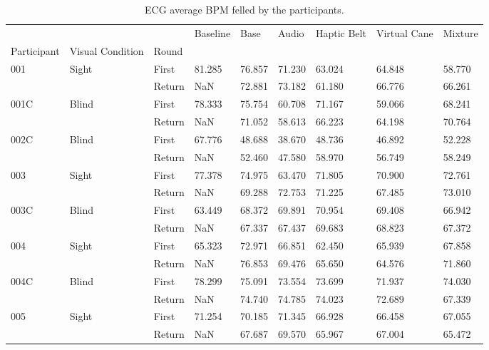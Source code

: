 
\begin{table}[!htb]
\centering
\caption{ECG average BPM felled by the participants.}
\label{tab:ecg_bpm_table}
\begin{tabular}{lllllllll}
\toprule
    &       &        &  Baseline &   Base &  Audio &  Haptic Belt &  Virtual Cane &  Mixture \\
Participant & Visual Condition & Round &           &        &        &              &               &          \\
\midrule
001 & Sight & First &    81.285 & 76.857 & 71.230 &       63.024 &        64.848 &   58.770 \\
    &       & Return &       NaN & 72.881 & 73.182 &       61.180 &        66.776 &   66.261 \\
001C & Blind & First &    78.333 & 75.754 & 60.708 &       71.167 &        59.066 &   68.241 \\
    &       & Return &       NaN & 71.052 & 58.613 &       66.223 &        64.198 &   70.764 \\
002C & Blind & First &    67.776 & 48.688 & 38.670 &       48.736 &        46.892 &   52.228 \\
    &       & Return &       NaN & 52.460 & 47.580 &       58.970 &        56.749 &   58.249 \\
003 & Sight & First &    77.378 & 74.975 & 63.470 &       71.805 &        70.900 &   72.761 \\
    &       & Return &       NaN & 69.288 & 72.753 &       71.225 &        67.485 &   73.010 \\
003C & Blind & First &    63.449 & 68.372 & 69.891 &       70.954 &        69.408 &   66.942 \\
    &       & Return &       NaN & 67.337 & 67.437 &       69.683 &        68.823 &   67.372 \\
004 & Sight & First &    65.323 & 72.971 & 66.851 &       62.450 &        65.939 &   67.858 \\
    &       & Return &       NaN & 76.853 & 69.476 &       65.650 &        64.576 &   71.860 \\
004C & Blind & First &    78.299 & 75.091 & 73.554 &       73.699 &        71.937 &   74.030 \\
    &       & Return &       NaN & 74.740 & 74.785 &       74.023 &        72.689 &   67.339 \\
005 & Sight & First &    71.254 & 70.185 & 71.345 &       66.928 &        66.458 &   67.055 \\
    &       & Return &       NaN & 67.687 & 69.570 &       65.967 &        67.004 &   65.472 \\
\bottomrule
\end{tabular}
\end{table}

